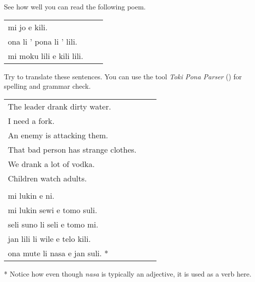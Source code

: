 See how well you can read the following poem. 

\begin{supertabular}{p{5,5cm}|ll}
mi jo e kili. && \\ %
ona li ' pona li ' lili. && \\ %
mi moku lili e kili lili. && \\ %
\end{supertabular} 

Try to translate these sentences. 
You can use the tool \textit{Toki Pona Parser} (\cite{www:rowa:02}) for spelling and grammar check. 

\begin{supertabular}{p{5,5cm}|ll}
The leader drank dirty water. &&   \\ %
I need a fork.   &&   \\ %
An enemy is attacking them.   &&   \\ %
That bad person has strange clothes.   &&  \\  %
We drank a lot of vodka.   &&   \\ %
Children watch adults.   &&   \\ %
 && \\ %
mi lukin e ni. &&  \\ %
mi lukin sewi e tomo suli.  &&    \\ %
seli suno li seli e tomo mi.  &&   \\ %
jan lili li wile e telo kili.  &&  \\ %
ona mute li nasa e jan suli. * &&  \\ %
\end{supertabular} 

* Notice how even though \textit{nasa} is typically an adjective, it is used as a verb here. 
